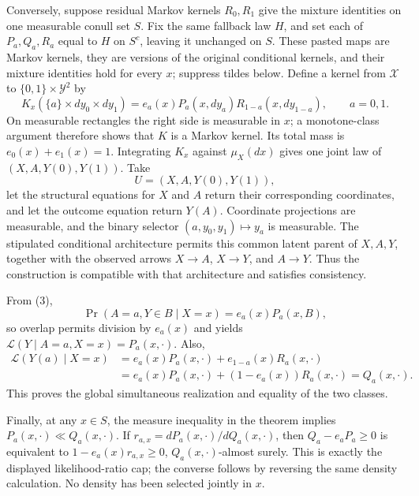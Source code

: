 Conversely, suppose residual Markov kernels \(R_0,R_1\) give the mixture identities on one measurable conull set \(S\).  Fix the same fallback law \(H\), and set each of \(P_a,Q_a,R_a\) equal to \(H\) on \(S^c\), leaving it unchanged on \(S\).  These pasted maps are Markov kernels, they are versions of the original conditional kernels, and their mixture identities hold for every \(x\); suppress tildes below.  Define a kernel from \(\mathcal X\) to \(\{0,1\}\times\mathcal Y^2\) by
\[
 K_x(\{a\}\times dy_0\times dy_1)
 =e_a(x)P_a(x,dy_a)R_{1-a}(x,dy_{1-a}),\qquad a=0,1. \tag{3}
\]
On measurable rectangles the right side is measurable in \(x\); a monotone-class argument therefore shows that \(K\) is a Markov kernel.  Its total mass is \(e_0(x)+e_1(x)=1\).  Integrating \(K_x\) against \(\mu_X(dx)\) gives one joint law of \((X,A,Y(0),Y(1))\).  Take
\[
 U=(X,A,Y(0),Y(1)),
\]
let the structural equations for \(X\) and \(A\) return their corresponding coordinates, and let the outcome equation return \(Y(A)\).  Coordinate projections are measurable, and the binary selector \((a,y_0,y_1)\mapsto y_a\) is measurable.  The stipulated conditional architecture permits this common latent parent of \(X,A,Y\), together with the observed arrows \(X\to A\), \(X\to Y\), and \(A\to Y\).  Thus the construction is compatible with that architecture and satisfies consistency.

From (3),
\[
 \Pr(A=a,Y\in B\mid X=x)=e_a(x)P_a(x,B),
\]
so overlap permits division by \(e_a(x)\) and yields \(\mathcal L(Y\mid A=a,X=x)=P_a(x,\cdot)\).  Also,
\[
\begin{aligned}
 \mathcal L(Y(a)\mid X=x)
 &=e_a(x)P_a(x,\cdot)+e_{1-a}(x)R_a(x,\cdot)\\
 &=e_a(x)P_a(x,\cdot)+(1-e_a(x))R_a(x,\cdot)=Q_a(x,\cdot).
\end{aligned}\tag{4}
\]
This proves the global simultaneous realization and equality of the two classes.

Finally, at any \(x\in S\), the measure inequality in the theorem implies \(P_a(x,\cdot)\ll Q_a(x,\cdot)\).  If \(r_{a,x}=dP_a(x,\cdot)/dQ_a(x,\cdot)\), then \(Q_a-e_aP_a\ge0\) is equivalent to \(1-e_a(x)r_{a,x}\ge0\), \(Q_a(x,\cdot)\)-almost surely.  This is exactly the displayed likelihood-ratio cap; the converse follows by reversing the same density calculation.  No density has been selected jointly in \(x\).